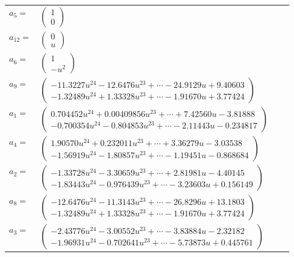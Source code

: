 \documentclass[1p]{elsarticle_modified}
\theoremstyle{definition}
\begin{document}
\begin{tabular}{m{7pt} m{180pt} m{7pt} m{180pt} }
\flushright $a_{5}=$&$\begin{pmatrix}1\\0\end{pmatrix}$ \\
\flushright $a_{12}=$&$\begin{pmatrix}0\\u\end{pmatrix}$ \\
\flushright $a_{6}=$&$\begin{pmatrix}1\\- u^2\end{pmatrix}$ \\
\flushright $a_{9}=$&$\begin{pmatrix}-11.3227 u^{24}-12.6476 u^{23}+\cdots-24.9129 u+9.40603\\-1.32489 u^{24}+1.33328 u^{23}+\cdots-1.91670 u+3.77424\end{pmatrix}$ \\
\flushright $a_{1}=$&$\begin{pmatrix}0.704452 u^{24}+0.00409856 u^{23}+\cdots+7.42560 u-3.81888\\-0.700354 u^{24}-0.804853 u^{23}+\cdots-2.11443 u-0.234817\end{pmatrix}$ \\
\flushright $a_{4}=$&$\begin{pmatrix}1.90570 u^{24}+0.232011 u^{23}+\cdots+3.36279 u-3.03538\\-1.56919 u^{24}-1.80857 u^{23}+\cdots-1.19451 u-0.868684\end{pmatrix}$ \\
\flushright $a_{2}=$&$\begin{pmatrix}-1.33728 u^{24}-3.30659 u^{23}+\cdots+2.81981 u-4.40145\\-1.83443 u^{24}-0.976439 u^{23}+\cdots-3.23603 u+0.156149\end{pmatrix}$ \\
\flushright $a_{8}=$&$\begin{pmatrix}-12.6476 u^{24}-11.3143 u^{23}+\cdots-26.8296 u+13.1803\\-1.32489 u^{24}+1.33328 u^{23}+\cdots-1.91670 u+3.77424\end{pmatrix}$ \\
\flushright $a_{3}=$&$\begin{pmatrix}-2.43776 u^{24}-3.00552 u^{23}+\cdots-3.83884 u-2.32182\\-1.96931 u^{24}-0.702641 u^{23}+\cdots-5.73873 u+0.445761\end{pmatrix}$ \\

\end{tabular}
\end{document}
